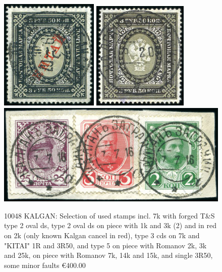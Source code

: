 \begin{figure}[htbp]
\centering
\includegraphics[width=.30\textwidth]{../russian-post-offices-in-china/10048-1.jpg}
\includegraphics[width=.30\textwidth]{../russian-post-offices-in-china/10048-2.jpg}
\includegraphics[width=.90\textwidth]{../russian-post-offices-in-china/10048.jpg}
\caption{
10048	KALGAN: Selection of used stamps incl. 7k with forged T\&S type 2 oval ds, 
type 2 oval ds on piece with 1k and 3k (2) and in red on 2k (only known Kalgan 
cancel in red), type 3 cds on 7k and "KITAI" 1R and 3R50, and type 5 on piece 
with Romanov 2k, 3k and 25k, on piece with Romanov 7k, 14k and 15k, and single 
3R50, some minor faults
\euro 400.00
}  
\end{figure} 

